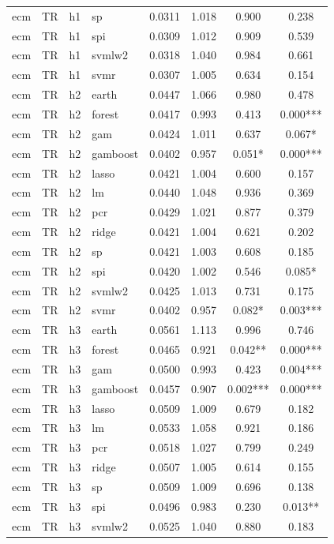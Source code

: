 \begin{ThreePartTable}
\begin{longtable}[t]{llclcccc}
ecm & TR & h1 & sp & 0.0311 & 1.018 & 0.900 & 0.238\\
ecm & TR & h1 & spi & 0.0309 & 1.012 & 0.909 & 0.539\\
ecm & TR & h1 & svmlw2 & 0.0318 & 1.040 & 0.984 & 0.661\\
ecm & TR & h1 & svmr & 0.0307 & 1.005 & 0.634 & 0.154\\
\addlinespace
ecm & TR & h2 & earth & 0.0447 & 1.066 & 0.980 & 0.478\\
ecm & TR & h2 & forest & 0.0417 & 0.993 & 0.413 & 0.000***\\
ecm & TR & h2 & gam & 0.0424 & 1.011 & 0.637 & 0.067*\\
ecm & TR & h2 & gamboost & 0.0402 & 0.957 & 0.051* & 0.000***\\
ecm & TR & h2 & lasso & 0.0421 & 1.004 & 0.600 & 0.157\\
ecm & TR & h2 & lm & 0.0440 & 1.048 & 0.936 & 0.369\\
ecm & TR & h2 & pcr & 0.0429 & 1.021 & 0.877 & 0.379\\
ecm & TR & h2 & ridge & 0.0421 & 1.004 & 0.621 & 0.202\\
ecm & TR & h2 & sp & 0.0421 & 1.003 & 0.608 & 0.185\\
ecm & TR & h2 & spi & 0.0420 & 1.002 & 0.546 & 0.085*\\
ecm & TR & h2 & svmlw2 & 0.0425 & 1.013 & 0.731 & 0.175\\
ecm & TR & h2 & svmr & 0.0402 & 0.957 & 0.082* & 0.003***\\
\addlinespace
ecm & TR & h3 & earth & 0.0561 & 1.113 & 0.996 & 0.746\\
ecm & TR & h3 & forest & 0.0465 & 0.921 & 0.042** & 0.000***\\
ecm & TR & h3 & gam & 0.0500 & 0.993 & 0.423 & 0.004***\\
ecm & TR & h3 & gamboost & 0.0457 & 0.907 & 0.002*** & 0.000***\\
ecm & TR & h3 & lasso & 0.0509 & 1.009 & 0.679 & 0.182\\
ecm & TR & h3 & lm & 0.0533 & 1.058 & 0.921 & 0.186\\
ecm & TR & h3 & pcr & 0.0518 & 1.027 & 0.799 & 0.249\\
ecm & TR & h3 & ridge & 0.0507 & 1.005 & 0.614 & 0.155\\
ecm & TR & h3 & sp & 0.0509 & 1.009 & 0.696 & 0.138\\
ecm & TR & h3 & spi & 0.0496 & 0.983 & 0.230 & 0.013**\\
ecm & TR & h3 & svmlw2 & 0.0525 & 1.040 & 0.880 & 0.183\\

\end{longtable}
\end{ThreePartTable}
